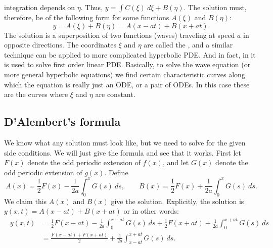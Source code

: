 integration depends on $\eta$.
Thus,
$y = \int C(\xi) ~ d\xi + B(\eta)$.
The solution must, therefore, be of the following form for some functions
$A(\xi)$ and $B(\eta)$:
\begin{equation*}
y = A(\xi) + B(\eta) = A(x-at) + B(x+at) .
\end{equation*}
The solution is a superposition of two functions (waves) traveling at speed
$a$
in opposite directions.  The coordinates $\xi$ and $\eta$ are called the
\emph{}, and a similar technique can
be applied to more complicated hyperbolic PDE\@.
And in fact, in  it is used to solve first
order linear PDE.  Basically, to solve the wave equation (or more general
hyperbolic equations) we find certain characteristic curves along which
the equation is really just an ODE, or a pair of ODEs.  In this case
these are the curves where $\xi$ and $\eta$ are constant.

\subsection{D'Alembert's formula}

We know what any solution must look like, but we need to solve for the
given side conditions.  We will just give the formula and see that it works.
First let $F(x)$
denote the odd periodic extension of $f(x)$, and let $G(x)$ denote the
odd periodic extension of $g(x)$.  Define
\begin{equation*}
A(x) = \frac{1}{2} F(x) - \frac{1}{2a} \int_0^x G(s) ~ds ,
\qquad
B(x) = \frac{1}{2} F(x) + \frac{1}{2a} \int_0^x G(s) ~ds .
\end{equation*}
We claim this $A(x)$ and $B(x)$ give the solution.  Explicitly, the
solution is $y(x,t) = A(x-at) + B(x+at)$ or in other words:
\begin{equation} \label{dalemb:form}
\boxed{~~
\begin{aligned}
y(x,t) & =
\frac{1}{2} F(x-at) - \frac{1}{2a} \int_0^{x-at} G(s) ~ds 
+
\frac{1}{2} F(x+at) + \frac{1}{2a} \int_0^{x+at} G(s) ~ds \\
& =
\frac{F(x-at) + F(x+at)}{2} + \frac{1}{2a} \int_{x-at}^{x+at} G(s) ~ds .
\end{aligned}
~~}
\end{equation}

